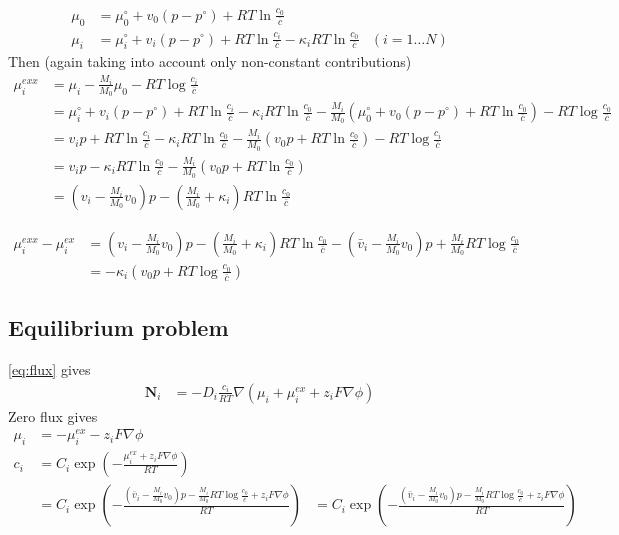 \documentclass[12pt,oneside,reqno]{amsart}
\numberwithin{equation}{section}
\begin{document}
\begin{align}
  \mu_0 &= \mu_0^\circ + v_0(p-p^\circ) + RT \ln \frac{c_0}{\bar c}\\
  \mu_i &= \mu_i^\circ + v_i(p-p^\circ) + RT \ln \frac{c_i}{\bar c} - \kappa_i RT \ln \frac{c_0}{\bar c}  & (i=1\dots N)
\end{align}
Then (again taking into account only non-constant contributions)
\begin{align}
  \mu_i^{exx} &=  \mu_i - \frac{M_i}{M_0} \mu_0  - RT \log \frac{c_i}{\bar c} \nonumber\\
             &= \mu_i^\circ + v_i(p-p^\circ) + RT \ln \frac{c_i}{\bar c} - \kappa_i RT \ln \frac{c_0}{\bar c}
               - \frac{M_i}{M_0}\left(\mu_0^\circ + v_0(p-p^\circ) + RT \ln \frac{c_0}{\bar c}\right)- RT \log \frac{c_0}{\bar c}\\
             &= v_ip + RT \ln \frac{c_i}{\bar c} - \kappa_i RT \ln \frac{c_0}{\bar c}
               - \frac{M_i}{M_0}\left(v_0 p + RT \ln \frac{c_0}{\bar c}\right)- RT \log \frac{c_i}{\bar c}\\
             &= v_ip  - \kappa_i RT \ln \frac{c_0}{\bar c}
               - \frac{M_i}{M_0}\left(v_0 p + RT \ln \frac{c_0}{\bar c}\right)\\
             &= (v_i -\frac{M_i}{M_0}v_0)p  - \left(\frac{M_i}{M_0}+ \kappa_i\right)RT \ln \frac{c_0}{\bar c}
\end{align}

\begin{align}
\mu_i^{exx}-\mu_i^{ex}&=(v_i -\frac{M_i}{M_0}v_0)p  - \left(\frac{M_i}{M_0}+ \kappa_i\right)RT \ln \frac{c_0}{\bar c}
                        -  \left(\bar v_i-\frac{M_i}{M_0}v_0\right)p + \frac{M_i}{M_0}RT\log \frac{c_0}{\bar c}\\
                      &= -\kappa_i \left(v_0p+RT\log \frac{c_0}{\bar c}\right)
\end{align}

\subsection{Equilibrium problem}
\eqref{eq:flux} gives
\begin{align}\label{eq:flux}
  \mathbf N_i &= - D_i\frac{c_i}{RT}\nabla\left( \mu_i +  \mu_i^{ex} + z_i F \nabla \phi \right)
\end{align}
Zero flux gives 
\begin{align}
  \mu_i   &=   - \mu_i^{ex} - z_i F \nabla \phi\\
  c_i   &=  C_i\exp\left( -\frac{\mu_i^{ex} + z_i F \nabla \phi}{RT}\right)\\
        &=  C_i \exp\left(-\frac{\left(\bar v_i-\frac{M_i}{M_0}v_0\right)p - \frac{M_i}{M_0}RT\log \frac{c_0}{\bar c} + z_i F \nabla \phi}{RT}\right)
        &=  C_i \exp\left(-\frac{\left(\bar v_i-\frac{M_i}{M_0}v_0\right)p - \frac{M_i}{M_0}RT\log \frac{c_0}{\bar c} + z_i F \nabla \phi}{RT}\right)
\end{align}
\end{document}
